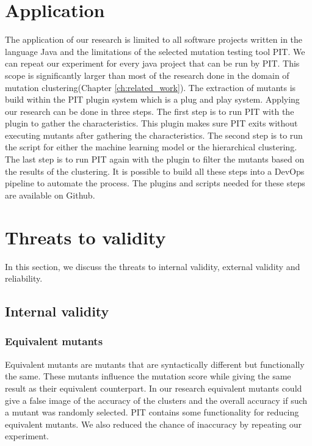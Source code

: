 \documentclass[../main]{subfiles}
\begin{document}
\section{Application}
The application of our research is limited to all software projects written in the language Java and the limitations of the selected mutation testing tool PIT\cite{pit}.
We can repeat our experiment for every java project that can be run by PIT.
This scope is significantly larger than most of the research done in the domain of mutation clustering(Chapter \ref{ch:related_work}).
The extraction of mutants is build within the PIT plugin system which is a plug and play system.
Applying our research can be done in three steps.
The first step is to run PIT with the plugin to gather the characteristics.
This plugin makes sure PIT exits without executing mutants after gathering the characteristics.
The second step is to run the script for either the machine learning model or the hierarchical clustering.
The last step is to run PIT again with the plugin to filter the mutants based on the results of the clustering.
It is possible to build all these steps into a DevOps pipeline to automate the process. 
The plugins and scripts needed for these steps are available on Github\cite{rbasarat-repo}.

\section{Threats to validity}
In this section, we discuss the threats to internal validity, external validity and reliability.
\subsection{Internal validity}
\subsubsection{Equivalent mutants}
Equivalent mutants are mutants that are syntactically different but functionally the same.
These mutants influence the mutation score while giving the same result as their equivalent counterpart.
In our research equivalent mutants could give a false image of the accuracy of the clusters and the overall accuracy if such a mutant was randomly selected.
PIT contains some functionality for reducing equivalent mutants\cite{pit}.
We also reduced the chance of inaccuracy by repeating our experiment.
\end{document}
